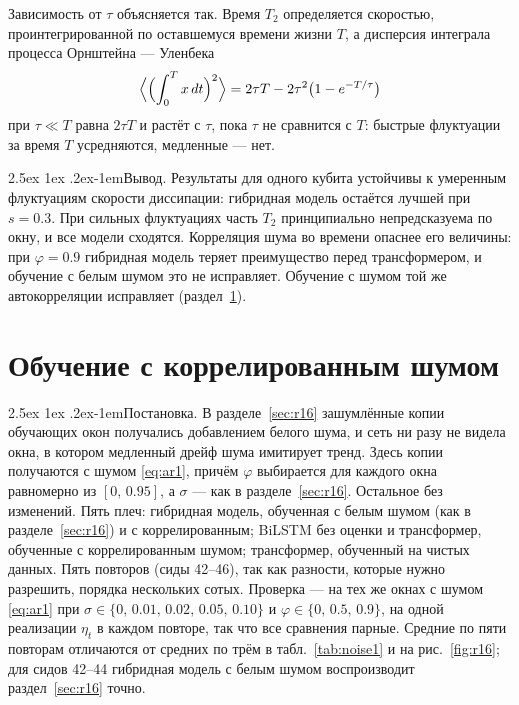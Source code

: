 \documentclass[12pt,a4paper]{report}
\makeatletter
\renewcommand\paragraph{\@startsection{paragraph}{4}{\z@}%
  {2.5ex \@plus1ex \@minus.2ex}{-1em}{\normalfont\normalsize\bfseries}}
\numberwithin{equation}{chapter}
\makeatother
\begin{document}
Зависимость от $\tau$ объясняется так. Время $T_2$ определяется скоростью,
проинтегрированной по оставшемуся времени жизни $T$, а дисперсия интеграла
процесса Орнштейна --- Уленбека
\begin{equation}
\Bigl\langle\Bigl(\int_0^T x\,dt\Bigr)^2\Bigr\rangle
=2\tau T-2\tau^2\bigl(1-e^{-T/\tau}\bigr)
\label{eq:ouint}
\end{equation}
при $\tau\ll T$ равна $2\tau T$ и растёт с $\tau$, пока $\tau$ не сравнится с
$T$: быстрые флуктуации за время $T$ усредняются, медленные --- нет.

\paragraph{Вывод.} Результаты для одного кубита устойчивы к умеренным
флуктуациям скорости диссипации: гибридная модель остаётся лучшей при
$s=0.3$. При сильных флуктуациях часть $T_2$ принципиально
непредсказуема по окну, и все модели сходятся. Корреляция шума во времени
опаснее его величины: при $\varphi=0.9$ гибридная модель теряет
преимущество перед трансформером, и обучение с белым шумом это не
исправляет. Обучение с шумом той же автокорреляции исправляет
(раздел~\ref{sec:r22}).

\section{Обучение с коррелированным шумом}
\label{sec:r22}

\paragraph{Постановка.} В разделе~\ref{sec:r16} зашумлённые копии обучающих
окон получались добавлением белого шума, и сеть ни разу не видела окна, в
котором медленный дрейф шума имитирует тренд. Здесь копии получаются с
шумом \eqref{eq:ar1}, причём $\varphi$ выбирается для каждого окна
равномерно из $[0,\,0.95]$, а $\sigma$ --- как в разделе~\ref{sec:r16}.
Остальное без изменений. Пять плеч: гибридная модель, обученная с белым
шумом (как в разделе~\ref{sec:r16}) и с коррелированным; BiLSTM без оценки
и трансформер, обученные с коррелированным шумом; трансформер, обученный на
чистых данных. Пять повторов (сиды 42--46), так как разности, которые
нужно разрешить, порядка нескольких сотых. Проверка --- на тех же окнах с
шумом \eqref{eq:ar1} при $\sigma\in\{0,\,0.01,\,0.02,\,0.05,\,0.10\}$ и
$\varphi\in\{0,\,0.5,\,0.9\}$, на одной реализации $\eta_t$ в каждом
повторе, так что все сравнения парные. Средние по пяти повторам
отличаются от средних по трём в табл.~\ref{tab:noise1} и на
рис.~\ref{fig:r16}; для сидов 42--44 гибридная модель с белым шумом
воспроизводит раздел~\ref{sec:r16} точно.
\end{document}
